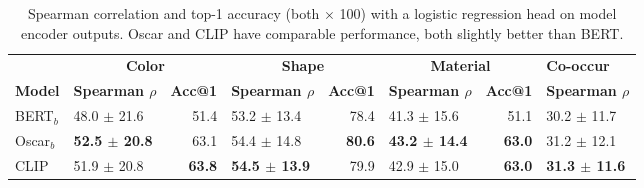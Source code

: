 \documentclass[11pt]{article}
\begin{document}
\begin{table*}[t!]
\small
\centering
\begin{tabular}{l|lr|lr|lr|l}
\hline
& \multicolumn{2}{c|}{\textbf{Color}} & \multicolumn{2}{c|}{\textbf{Shape}} & \multicolumn{2}{c|}{\textbf{Material}} & \textbf{Co-occur} \\
\cmidrule(lr){2-3}\cmidrule(lr){4-5}\cmidrule(lr){6-7}\cmidrule(lr){8-8}
\textbf{Model} & \textbf{Spearman $\rho$} & \textbf{Acc@1} & \textbf{Spearman $\rho$} & \textbf{Acc@1} & \textbf{Spearman $\rho$} & \textbf{Acc@1} & \textbf{Spearman $\rho$}\\
\hline
BERT$_b$ & 48.0 $\pm$ 21.6 & 51.4 & 53.2 $\pm$ 13.4 & 78.4 & 41.3 $\pm$ 15.6 & 51.1 & 30.2 $\pm$ 11.7 \\
Oscar$_b$ & \textbf{52.5 $\pm$ 20.8} & 63.1 & 54.4 $\pm$ 14.8 & \textbf{80.6} & \textbf{43.2 $\pm$ 14.4} & \textbf{63.0} & 31.2 $\pm$ 12.1\\
CLIP & 51.9 $\pm$ 20.8 & \textbf{63.8} & \textbf{54.5 $\pm$ 13.9} & 79.9 & 42.9 $\pm$ 15.0 & \textbf{63.0} & \textbf{31.3 $\pm$ 11.6}\\
\hline
\end{tabular}
\caption{\label{logistic-reg}
Spearman correlation and top-1 accuracy (both $\times$ 100) with a logistic regression head on model encoder outputs. Oscar and CLIP have comparable performance, both slightly better than BERT.}
\end{table*}
\end{document}
